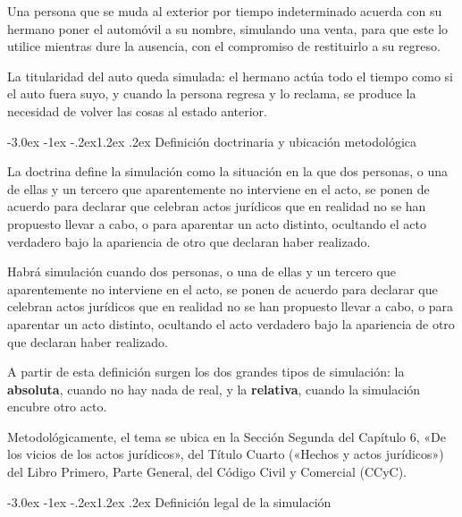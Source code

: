 \documentclass[12pt,oneside]{book}
\makeatletter
\renewcommand\section{\@startsection{section}{1}{\z@}%
  {-3.0ex \@plus -1ex \@minus -.2ex}{1.2ex \@plus .2ex}%
  {\normalfont\large\bfseries\color{acento}}}
\makeatother
\begin{document}
\begin{ejemplo}
Una persona que se muda al exterior por tiempo indeterminado acuerda con su hermano poner el automóvil a su nombre, simulando una venta, para que este lo utilice mientras dure la ausencia, con el compromiso de restituirlo a su regreso.

La titularidad del auto queda simulada: el hermano actúa todo el tiempo como si el auto fuera suyo, y cuando la persona regresa y lo reclama, se produce la necesidad de volver las cosas al estado anterior.
\end{ejemplo}

\section{Definición doctrinaria y ubicación metodológica}

La doctrina define la simulación como la situación en la que dos personas, o una de ellas y un tercero que aparentemente no interviene en el acto, se ponen de acuerdo para declarar que celebran actos jurídicos que en realidad no se han propuesto llevar a cabo, o para aparentar un acto distinto, ocultando el acto verdadero bajo la apariencia de otro que declaran haber realizado.

\begin{definicion}[{Simulación}]
Habrá simulación cuando dos personas, o una de ellas y un tercero que aparentemente no interviene en el acto, se ponen de acuerdo para declarar que celebran actos jurídicos que en realidad no se han propuesto llevar a cabo, o para aparentar un acto distinto, ocultando el acto verdadero bajo la apariencia de otro que declaran haber realizado.
\end{definicion}

A partir de esta definición surgen los dos grandes tipos de simulación: la \textbf{absoluta}, cuando no hay nada de real, y la \textbf{relativa}, cuando la simulación encubre otro acto.

Metodológicamente, el tema se ubica en la Sección Segunda del Capítulo 6, «De los vicios de los actos jurídicos», del Título Cuarto («Hechos y actos jurídicos») del Libro Primero, Parte General, del Código Civil y Comercial (CCyC).

\section{Definición legal de la simulación}
\end{document}
